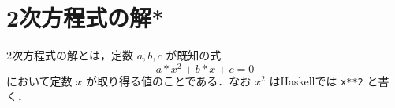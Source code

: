 \documentclass[a5paper,twoside,fleqn,draft]{jsbook}
\newcommand{\programminglanguage}[1]{\textsf{#1}}
\newcommand{\haskell}{\programminglanguage{Haskell}}
\newcommand{\code}[1]{\texttt{#1}}
\begin{document}

\section{2次方程式の解*}

2次方程式の解とは，定数 $a,b,c$ が既知の式
\begin{equation}
a*x^2+b*x+c=0
\end{equation}
において定数 $x$ が取り得る値のことである．なお $x^2$ は\haskell では
\code{x**2} と書く．
\end{document}

